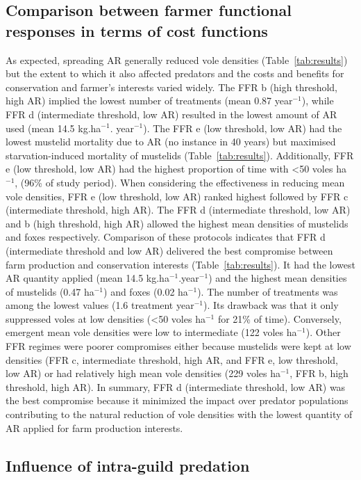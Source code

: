 \documentclass[11pt]{article}
\begin{document}
\subsection{Comparison between farmer functional responses in terms of cost functions}

As expected, spreading AR generally reduced vole densities (Table~\ref{tab:results}) but the extent to which it also affected predators and the costs and benefits for conservation and farmer’s interests varied widely. 
The FFR b (high threshold, high AR) implied the lowest number of treatments (mean 0.87 year$^{-1}$), while FFR d (intermediate threshold, low AR) resulted in the lowest amount of AR used (mean 14.5 kg.ha$^{-1}$. year$^{-1}$). The FFR e (low threshold, low AR) had the lowest mustelid mortality due to AR (no instance in 40 years) but maximised starvation-induced mortality of mustelids (Table~\ref{tab:results}). Additionally, FFR e (low threshold, low AR) had the highest proportion of time with <50 voles ha$^{-1}$, (96\% of study period). When considering the effectiveness in reducing mean vole densities, FFR e (low threshold, low AR) ranked highest followed by FFR c (intermediate threshold, high AR). The FFR d (intermediate threshold, low AR) and b (high threshold, high AR) allowed the highest mean densities of mustelids and foxes respectively. 
Comparison of these protocols indicates that FFR d (intermediate threshold and low AR) delivered the best compromise between farm production and conservation interests (Table~\ref{tab:results}). It had the lowest AR quantity applied (mean 14.5 kg.ha$^{-1}$.year$^{-1}$) and the highest mean densities of mustelids (0.47 ha$^{-1}$) and foxes (0.02 ha$^{-1}$). The number of treatments was among the lowest values (1.6 treatment year$^{-1}$). Its drawback was that it only suppressed voles at low densities (<50 voles ha$^{-1}$ for 21\% of time).  Conversely, emergent mean vole densities were low to intermediate (122 voles ha$^{-1}$). 
Other FFR regimes were poorer compromises either because mustelids were kept at low densities (FFR  c, intermediate threshold, high AR, and FFR e, low threshold, low AR) or had relatively high mean vole densities (229 voles ha$^{-1}$, FFR b, high threshold, high AR). In summary, FFR d (intermediate threshold, low AR) was the best compromise because it minimized the impact over predator populations contributing to the natural reduction of vole densities with the lowest quantity of AR applied for farm production interests.

\subsection{Influence of intra-guild predation}
\end{document}
